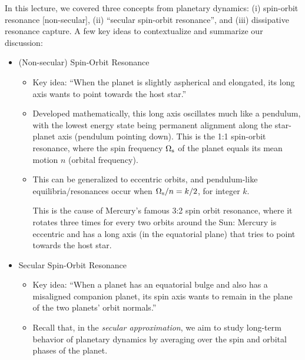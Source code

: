 \documentclass[11pt,
        usenames, %
        dvipsnames %
    ]{article}
\begin{document}
In this lecture, we covered three concepts from planetary dynamics: (i)
spin-orbit resonance [non-secular], (ii) ``secular spin-orbit resonance'', and
(iii) dissipative resonance capture. A few key ideas to contextualize and
summarize our discussion:
\begin{itemize}
    \item (Non-secular) Spin-Orbit Resonance
        \begin{itemize}
            \item Key idea: ``When the planet is slightly aspherical and
                elongated, its long axis wants to point towards the host star.''

            \item Developed mathematically, this long axis oscillates much like
                a pendulum, with the lowest energy state being permanent
                alignment along the star-planet axis (pendulum pointing down).
                This is the 1:1 spin-orbit resonance, where the spin frequency
                $\Omega_{\rm s}$ of the planet equals its mean motion $n$
                (orbital frequency).

            \item This can be generalized to eccentric orbits, and pendulum-like
                equilibria/resonances occur when $\Omega_{\rm s} / n = k/2$, for
                integer $k$.

                This is the cause of Mercury's famous 3:2 spin
                orbit resonance, where it rotates three times for every two
                orbits around the Sun: Mercury is eccentric and has a long axis
                (in the equatorial plane) that tries to point towards the host
                star.
        \end{itemize}

    \item Secular Spin-Orbit Resonance
        \begin{itemize}
            \item Key idea: ``When a planet has an equatorial bulge and also has
                a misaligned companion planet, its spin axis wants to remain in
                the plane of the two planets' orbit normals.''

            \item Recall that, in the \emph{secular approximation}, we aim to
                study long-term behavior of planetary dynamics by averaging over
                the spin and orbital phases of the planet.


\end{itemize}
\end{itemize}
\end{document}
